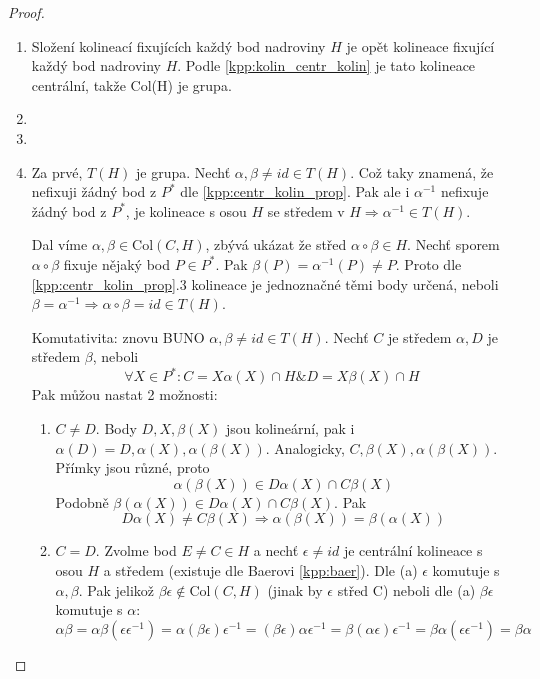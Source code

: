 \begin{proof}~
	\begin{enumerate}
		\item Složení kolineací fixujících každý bod nadroviny $H$ je opět kolineace fixující každý bod nadroviny $H$.
	 Podle \cref{kpp:kolin_centr_kolin} je tato kolineace centrální, takže Col(H) je grupa.
 		\item
 		\item
		\item Za prvé, $T(H)$ je grupa. Nechť $\alpha, \beta \ne id \in T(H)$.
			Což taky znamená, že nefixuji žádný bod z $P^*$ dle \cref{kpp:centr_kolin_prop}.
			Pak ale i $\alpha^{-1}$ nefixuje žádný bod z $P^*$, je kolineace s osou $H$ se středem v $H \Rightarrow \alpha^{-1} \in T(H)$.

			Dal víme $\alpha, \beta \in \mathrm{Col}(C,H)$, zbývá ukázat že střed $\alpha \circ \beta \in H$.
			Nechť sporem $\alpha \circ \beta$ fixuje nějaký bod $P \in P^*$.
			Pak $\beta(P) = \alpha^{-1}(P) \ne P$.
			Proto dle \cref{kpp:centr_kolin_prop}.3 kolineace je jednoznačné těmi body určená, neboli $\beta = \alpha^{-1} \Rightarrow \alpha \circ \beta = id \in T(H)$.

			Komutativita: znovu BUNO $\alpha, \beta \ne id \in T(H)$.
			Nechť $C$ je středem $\alpha, D$ je středem $\beta$, neboli
			\[ \forall X \in P^*: C = X\alpha(X) \cap H \& D = X\beta(X) \cap H \]
			Pak můžou nastat 2 možnosti:
			\begin{enumerate}
				\item $C \ne D$. Body $D, X, \beta(X)$ jsou kolineární, pak i $\alpha(D) = D, \alpha(X), \alpha(\beta(X))$.
					Analogicky, $C, \beta(X), \alpha(\beta(X))$. Přímky jsou různé, proto
					\[ \alpha(\beta(X)) \in D\alpha(X) \cap C\beta(X) \]
					Podobně $\beta(\alpha(X)) \in D\alpha(X) \cap C\beta(X)$.
					Pak
					\[ D\alpha(X) \ne C\beta(X) \Rightarrow \alpha(\beta(X)) = \beta(\alpha(X)) \]
				\item $C = D$. Zvolme bod $E \ne C \in H$ a nechť $\epsilon \ne id$ je centrální kolineace s osou $H$ a středem (existuje dle Baerovi \cref{kpp:baer}).
					Dle (a) $\epsilon$ komutuje s $\alpha, \beta$.
					Pak jelikož $\beta\epsilon \notin \mathrm{Col}(C,H)$ (jinak by $\epsilon$ střed C) neboli dle (a) $\beta \epsilon$ komutuje s $\alpha$:
					\[ \alpha\beta = \alpha\beta(\epsilon\epsilon^{-1}) = \alpha(\beta\epsilon)\epsilon^{-1} = (\beta\epsilon)\alpha\epsilon^{-1} = \beta(\alpha\epsilon)\epsilon^{-1} = \beta\alpha (\epsilon\epsilon^{-1}) = \beta \alpha \]
			\end{enumerate}
	\end{enumerate}
\end{proof}

